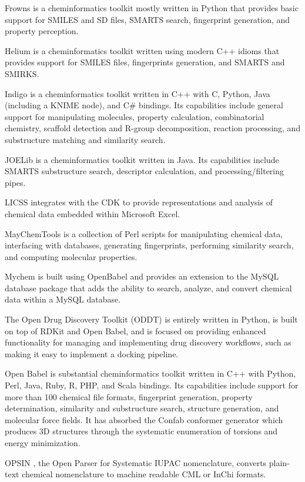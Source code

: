 Frowns is a cheminformatics toolkit mostly written in Python that provides basic support for SMILES and SD files, SMARTS search, fingerprint generation, and property perception.

Helium is a cheminformatics toolkit written using modern C++ idioms that provides support for SMILES files, fingerprints generation, and SMARTS and SMIRKS.

Indigo \cite{Pavlov_2011} is a cheminformatics toolkit written in C++ with C, Python, Java (including a KNIME node), and C\# bindings.  Its capabilities include general support for manipulating molecules, property calculation, combinatorial chemistry, scaffold detection and R-group decomposition, reaction processing, and substructure matching and similarity search.

JOELib is a cheminformatics toolkit written in Java. Its capabilities include SMARTS substructure search, descriptor calculation, and processing/filtering pipes.

LICSS \cite{Lawson_2012} integrates with the CDK to provide representations and analysis of chemical data embedded within Microsoft Excel.

MayChemTools is a collection of Perl scripts for manipulating chemical data, interfacing with databases, generating fingerprints, performing similarity search, and computing molecular properties.

Mychem is built using OpenBabel and provides an extension to the MySQL database package that adds the ability to search, analyze, and convert chemical data within a MySQL database.

The Open Drug Discovery Toolkit (ODDT) \cite{W_jcikowski_2015} is entirely written in Python, is built on top of RDKit and Open Babel, and is focused on providing enhanced functionality for managing and implementing drug discovery workflows, such as making it easy to implement a docking pipeline. 

Open Babel \cite{O_Boyle_2011} is substantial cheminformatics toolkit written in C++ with Python, Perl, Java, Ruby, R, PHP, and Scala bindings.  Its capabilities include support for more than 100 chemical file formats, fingerprint generation, property determination, similarity and substructure search, structure generation, and molecular force fields.  It has absorbed the Confab \cite{confab} conformer generator which produces 3D structures through the systematic enumeration of torsions and energy minimization.

OPSIN \cite{Lowe_2011}, the Open Parser for Systematic IUPAC nomenclature, converts plain-text chemical nomenclature to machine readable CML or InChi formats.

